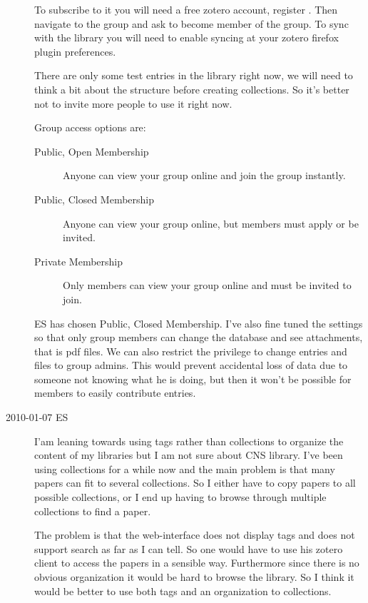 \begin{description}
To subscribe to it you will need a free zotero account, register
. Then navigate
to the group  and
ask to become member of the group. To sync with the library you
will need to enable syncing at your zotero firefox plugin preferences.

There are only some test entries in the library right now, we will need
to think a bit about the structure before creating collections. So it's
better not to invite more people to use it right now.

Group access options are:
\begin{description}
 \item[Public, Open Membership] Anyone can view your group online and join the group instantly.
 \item[Public, Closed Membership] Anyone can view your group online, but members must apply or be invited.
 \item[Private Membership] Only members can view your group online and must be invited to join.
\end{description}

ES has chosen Public, Closed Membership. I've also fine tuned the settings so that 
only group members can change the database and see attachments, that
is pdf files. We can also restrict the privilege to change entries and files to group admins. This would
prevent accidental loss of data due to someone not knowing what he is doing, but then it won't be
possible for members to easily contribute entries.

\item[2010-01-07 ES] I'am leaning towards using tags rather than collections to organize the content
of my libraries but I am not sure about CNS library. I've been using collections for a while now
and the main problem is that many papers can fit to several collections.
So I either have to copy papers to all possible collections, or I end up having to browse
through multiple collections to find a paper.

The problem is that the web-interface does not display tags and does not support search as far as I can
tell. So one would have to use his zotero client to access the papers in a sensible way. Furthermore
since there is no obvious organization it would be hard to browse the library. So I think it would be
better to use both tags and an organization to collections.


\end{description}
